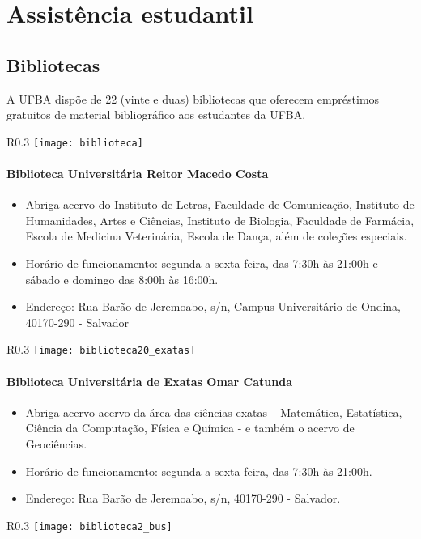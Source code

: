 \chapter{Assistência estudantil}
\section{Bibliotecas}
    A UFBA dispõe de 22 (vinte e duas) bibliotecas que oferecem empréstimos gratuitos de material bibliográfico aos estudantes da UFBA.
    \begin{wrapfigure}{R}{0.3\textwidth}
            \centering
            \texttt{[image: biblioteca]}
        \end{wrapfigure}
    \subsubsection{Biblioteca Universitária Reitor Macedo Costa}
        \begin{itemize}
            \item Abriga acervo do Instituto de Letras, Faculdade de Comunicação, Instituto de Humanidades, Artes e Ciências, Instituto de Biologia, Faculdade de Farmácia, Escola de Medicina Veterinária, Escola de Dança, além de coleções especiais.
            \item Horário de funcionamento: segunda a sexta-feira, das 7:30h às 21:00h e sábado e domingo das 8:00h às 16:00h.
            \item Endereço: Rua Barão de Jeremoabo, s/n, Campus Universitário de Ondina, 40170-290 - Salvador
        \end{itemize}
        
\begin{wrapfigure}{R}{0.3\textwidth}
    \centering
    \texttt{[image: biblioteca20\_exatas]}
\end{wrapfigure}
    \subsubsection{Biblioteca Universitária de Exatas Omar Catunda}
        \begin{itemize}
            \item Abriga acervo acervo da área das ciências exatas – Matemática, Estatística, Ciência da Computação, Física e Química - e também o acervo de Geociências.
            \item Horário de funcionamento: segunda a sexta-feira, das 7:30h às 21:00h.
            \item Endereço: Rua Barão de Jeremoabo, s/n, 40170-290 - Salvador.
        \end{itemize}
    \begin{wrapfigure}{R}{0.3\textwidth}
            \centering
            \texttt{[image: biblioteca2\_bus]}
    \end{wrapfigure}
